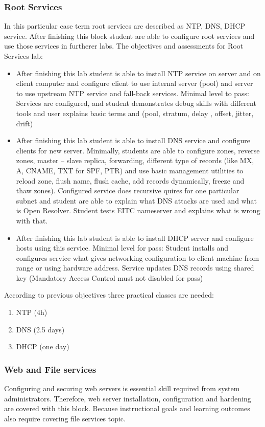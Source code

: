 \subsubsection{Root Services}
In this particular case term root services are described as \gls{NTP}, \gls{DNS}, \gls{DHCP} service.
After finishing this block student are able to configure root services and use those services in furtherer labs.
The objectives and assessments for Root Services lab:
\begin{itemize}
\item After finishing this lab student is able to install \gls{NTP} service on server and on client computer and configure client to use internal server (pool) and server to use upstream \gls{NTP} service and fall-back services. Minimal level to pass: Services are configured, and student demonstrates debug skills with different tools and user explains basic terms and (pool, stratum, delay , offset, jitter, drift)
\item After finishing this lab student is able to install \gls{DNS} service and configure clients for new server. Minimally, students are able to configure zones, reverse zones, master -- slave replica, forwarding, different type of records (like MX, A, CNAME, TXT for SPF, PTR) and use basic management utilities to reload zone, flush name, flush cache, add records dynamically, freeze and thaw zones). Configured service does recursive quires for one particular subnet and student are able to explain what DNS attacks are used and what is Open Resolver. Student tests \gls{EITC} nameserver and explains what is wrong with that.
\item After finishing this lab student is able to install \gls{DHCP} server and configure hosts using this service. Minimal level for pass: Student installs and configures service what gives networking configuration to client machine from range or using hardware address. Service updates \gls{DNS} records using shared key (Mandatory Access Control must not disabled for pass)
\end{itemize}
According to previous objectives three practical classes are needed:
\begin{enumerate}[label=LAB \arabic*.,leftmargin=*]
  	\item NTP (4h)
  	\item DNS (2.5 days)
  	\item DHCP (one day)
\end{enumerate}

\subsubsection{Web and File services}
Configuring and securing web servers is essential skill required from system administrators. Therefore, web server installation, configuration and hardening are covered with this block. Because instructional goals and learning outcomes also require covering file services topic.

